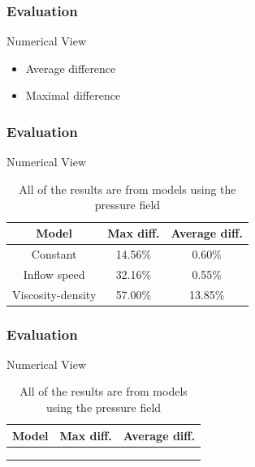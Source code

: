 \documentclass[18pt, xcolor=table]{beamer}
\begin{document}
\begin{frame}[t]
  \frametitle{Evaluation}
  \large{Numerical View}
  \begin{itemize}
  \item Average difference
  \item Maximal difference
  \end{itemize}
\end{frame}

\begin{frame}[t]
  \frametitle{Evaluation}
  \large{Numerical View}
  \vspace{1.5cm}
  \begin{center}
    \begin{table}
      \begin{tabular}{|c|c|c|}
        \hline
        \rowcolor{blue!50}
        \textbf{Model}    & \textbf{Max diff.} & \textbf{Average diff.} \\
        \hline
        Constant          & 14.56\% & 0.60\%  \\
        Inflow speed      & 32.16\% & 0.55\%  \\
        Viscosity-density & 57.00\% & 13.85\% \\
        \hline
      \end{tabular}
      \caption{All of the results are from models using the pressure field}
    \end{table}
  \end{center}

\end{frame}

\begin{frame}[t]
  \frametitle{Evaluation}
  \large{Numerical View}
  \vspace{1.5cm}
  \begin{center}
    \begin{table}
      \begin{tabular}{|c|c|c|}
        \hline
        \rowcolor{blue!50}
        \textbf{Model}                       & \textbf{Max diff.} & \textbf{Average diff.} \\
        \hline
        \color{gray!!140}{Constant}          & \color{gray!!140}{14.56\%} & \color{gray!!140}{0.60\%}  \\
        \rowcolor{gray!50}
        \color{red}{Inflow speed}            & \color{red}{32.16\%} & \color{red}{0.55\%}  \\
        \color{gray!!140}{Viscosity-density} & \color{gray!!140}{57.00\%} & \color{gray!!140}{13.85\%} \\
        \hline
      \end{tabular}
      \caption{All of the results are from models using the pressure field}
    \end{table}
  \end{center}
\end{frame}
\end{document}
